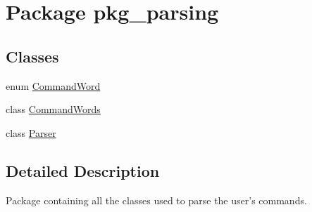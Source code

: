 \hypertarget{namespacepkg__parsing}{\section{Package pkg\-\_\-parsing}
\label{namespacepkg__parsing}
}
\subsection*{Classes}
\begin{DoxyCompactItemize}
\item 
enum \hyperlink{enumpkg__parsing_1_1CommandWord}{Command\-Word}
\item 
class \hyperlink{classpkg__parsing_1_1CommandWords}{Command\-Words}
\item 
class \hyperlink{classpkg__parsing_1_1Parser}{Parser}
\end{DoxyCompactItemize}


\subsection{Detailed Description}
Package containing all the classes used to parse the user's commands. 